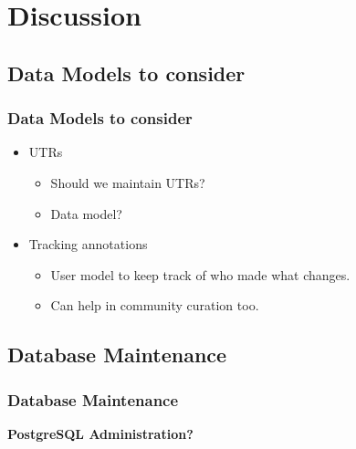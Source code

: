 \documentclass[hyperref={pdfpagelabels=false}, compress]{beamer}
\begin{document}
\section{Discussion}
\subsection{Data Models to consider}
\begin{frame}
    \frametitle{Data Models to consider}
	\begin{itemize}
		\item UTRs
		\begin{itemize}
			\item Should we maintain UTRs?
			\item Data model?
		\end{itemize}
		\item Tracking annotations
		\begin{itemize}
			\item User model to keep track of who made what changes. 
			\item Can help in community curation too.
		\end{itemize}
	\end{itemize}        
\end{frame}

\subsection{Database Maintenance}
\begin{frame}
   \frametitle{Database Maintenance}
   \begin{center}
   		\textbf{\Large PostgreSQL Administration?}
   	\end{center}
\end{frame}

\end{document}
